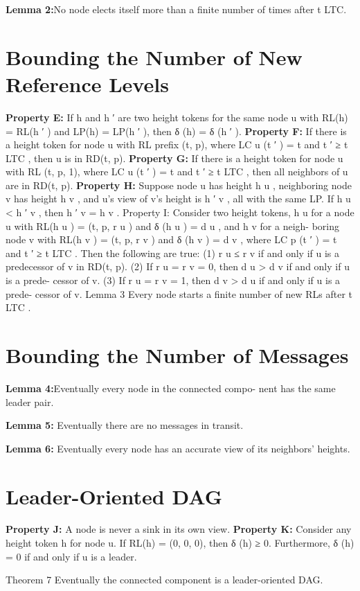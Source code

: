 \textbf{Lemma 2:}No node elects itself more than a finite number
of times after t LTC.

\section{Bounding the Number of New Reference Levels}
\textbf{Property E:} If h and h ′ are two height tokens for the same
node u with RL(h) = RL(h ′ ) and LP(h) = LP(h ′ ), then
δ (h) = δ (h ′ ).
\textbf{Property F:} If there is a height token for node u with RL
prefix (t, p), where LC u (t ′ ) = t and t ′ ≥ t LTC , then u is in
RD(t, p).
\textbf{Property G:} If there is a height token for node u with RL
(t, p, 1), where LC u (t ′ ) = t and t ′ ≥ t LTC , then all neighbors
of u are in RD(t, p).
\textbf{Property H:} Suppose node u has height h u , neighboring
node v has height h v , and u’s view of v’s height is h ′ v , all
with the same LP. If h u < h ′ v , then h ′ v = h v .
Property I: Consider two height tokens, h u for a node u
with RL(h u ) = (t, p, r u ) and δ (h u ) = d u , and h v for a neigh-
boring node v with RL(h v ) = (t, p, r v ) and δ (h v ) = d v , where
LC p (t ′ ) = t and t ′ ≥ t LTC . Then the following are true:
(1) r u ≤ r v if and only if u is a predecessor of v in RD(t, p).
(2) If r u = r v = 0, then d u > d v if and only if u is a prede-
cessor of v.
(3) If r u = r v = 1, then d v > d u if and only if u is a prede-
cessor of v.
Lemma 3 Every node starts a finite number of new RLs
after t LTC .
\section{Bounding the Number of Messages}
\textbf{Lemma 4:}Eventually every node in the connected compo-
nent has the same leader pair.

\textbf{Lemma 5:} Eventually there are no messages in transit.

\textbf{Lemma 6:} Eventually every node has an accurate view of
its neighbors’ heights.
\section{Leader-Oriented DAG}
\textbf{Property J:} A node is never a sink in its own view.
\textbf{Property K:} Consider any height token h for node u. If
RL(h) = (0, 0, 0), then δ (h) ≥ 0. Furthermore, δ (h) = 0 if
and only if u is a leader.

{Theorem 7} Eventually the connected component is a
leader-oriented DAG.




